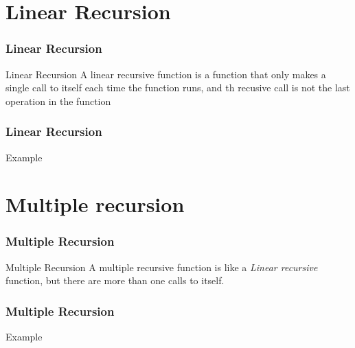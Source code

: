 \documentclass{beamer}
\begin{document}
\section{Linear Recursion}
\begin{frame}
	\frametitle{Linear Recursion}
	\begin{block}{Linear Recursion}
		A linear recursive function is a function that only makes a single call to itself each time the function runs, and th recusive call is not the last operation in the function
				\begin{algorithmic}[1]
					\State{}
				\Else
					\State{}
				\EndIf
				\EndProcedure
			\end{algorithmic}
	\end{block}
\end{frame}

\begin{frame}
	\frametitle{Linear Recursion}
	\begin{block}{Example}
				\begin{algorithmic}[1]
					\State{}
				\Else
					\State{}
				\EndIf
				\EndProcedure
			\end{algorithmic}
	\end{block}
\end{frame}
\section{Multiple recursion}
\begin{frame}
	\frametitle{Multiple Recursion}
	\begin{block}{Multiple Recursion}
		A multiple recursive function is like a \textit{Linear recursive} function, but there are more than one calls to itself.
				\begin{algorithmic}[1]
					\State{}
				\Else
					\State{}
				\EndIf
				\EndProcedure
			\end{algorithmic}
	\end{block}
\end{frame}
\begin{frame}
	\frametitle{Multiple Recursion}
	\begin{block}{Example}
			\begin{algorithmic}[1]
					\State{}
				\Else
						\State{}
					\Else
						\State{}
					\EndIf
				\EndIf
				\EndProcedure
			\end{algorithmic}
	\end{block}
\end{frame}
\end{document}

